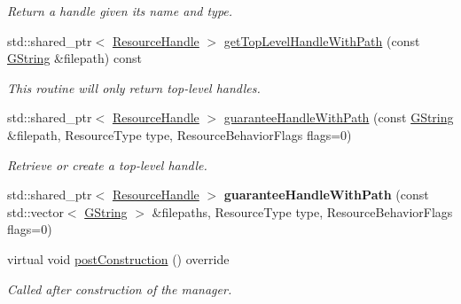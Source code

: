\begin{Indent}
\begin{DoxyCompactItemize}
\begin{DoxyCompactList}\small\item\em Return a handle given it\textquotesingle{}s name and type. \end{DoxyCompactList}\item 
\mbox{\label{classrev_1_1_resource_cache_a7d860682efe1eb737fa7d04ccc152bf3}} 
std\+::shared\+\_\+ptr$<$ \mbox{\hyperlink{classrev_1_1_resource_handle}{Resource\+Handle}} $>$ \mbox{\hyperlink{classrev_1_1_resource_cache_a7d860682efe1eb737fa7d04ccc152bf3}{get\+Top\+Level\+Handle\+With\+Path}} (const \mbox{\hyperlink{classrev_1_1_g_string}{G\+String}} \&filepath) const
\begin{DoxyCompactList}\small\item\em This routine will only return top-\/level handles. \end{DoxyCompactList}\item 
\mbox{\label{classrev_1_1_resource_cache_aa1cc7dcb9b002f0567695f5909de90bb}} 
std\+::shared\+\_\+ptr$<$ \mbox{\hyperlink{classrev_1_1_resource_handle}{Resource\+Handle}} $>$ \mbox{\hyperlink{classrev_1_1_resource_cache_aa1cc7dcb9b002f0567695f5909de90bb}{guarantee\+Handle\+With\+Path}} (const \mbox{\hyperlink{classrev_1_1_g_string}{G\+String}} \&filepath, Resource\+Type type, Resource\+Behavior\+Flags flags=0)
\begin{DoxyCompactList}\small\item\em Retrieve or create a top-\/level handle. \end{DoxyCompactList}\item 
\mbox{\label{classrev_1_1_resource_cache_a35bb620ee7260f5ef41bcabe87d7d327}} 
std\+::shared\+\_\+ptr$<$ \mbox{\hyperlink{classrev_1_1_resource_handle}{Resource\+Handle}} $>$ {\bfseries guarantee\+Handle\+With\+Path} (const std\+::vector$<$ \mbox{\hyperlink{classrev_1_1_g_string}{G\+String}} $>$ \&filepaths, Resource\+Type type, Resource\+Behavior\+Flags flags=0)
\item 
\mbox{\label{classrev_1_1_resource_cache_ae947d8b31bcf5d4fd78bc302f87bd2d2}} 
virtual void \mbox{\hyperlink{classrev_1_1_resource_cache_ae947d8b31bcf5d4fd78bc302f87bd2d2}{post\+Construction}} () override
\begin{DoxyCompactList}\small\item\em Called after construction of the manager. \end{DoxyCompactList}\item 

\end{DoxyCompactItemize}
\end{Indent}
